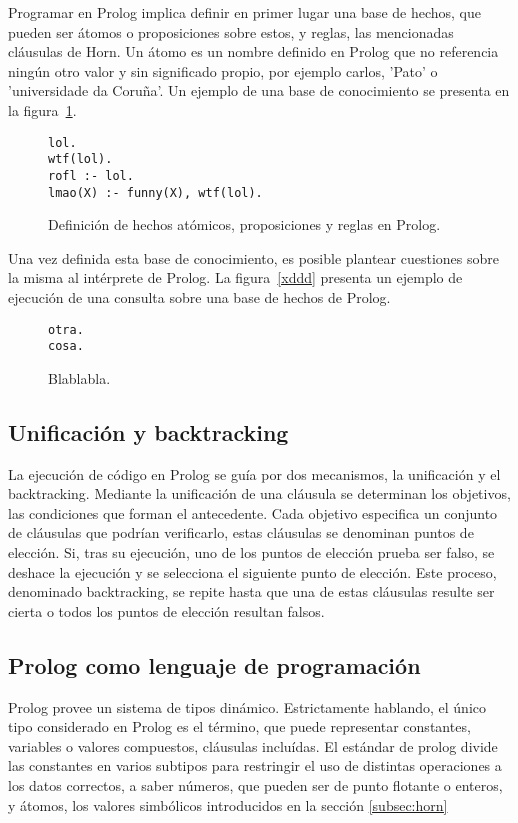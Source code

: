 \documentclass[11pt,captions=nooneline,DIV=14, parskip=full]{scrartcl}
\begin{document}
Programar en Prolog implica definir en primer lugar una base de hechos, que pueden ser átomos o proposiciones sobre estos, y reglas, las mencionadas cláusulas de Horn. Un átomo es un nombre definido en Prolog que no referencia ningún otro valor y sin significado propio, por ejemplo carlos, 'Pato' o 'universidade da Coruña'. Un ejemplo de una base de conocimiento se presenta en la figura~\ref{fig:knowledge}.

\begin{figure}[h]
\label{fig:knowledge}
\lstset{language=Prolog}
\begin{lstlisting}[frame=single]
lol.
wtf(lol).
rofl :- lol.
lmao(X) :- funny(X), wtf(lol).
\end{lstlisting} 
\caption{Definición de hechos atómicos, proposiciones y reglas en Prolog.}
\end{figure}

Una vez definida esta base de conocimiento, es posible plantear cuestiones sobre la misma al intérprete de Prolog. La figura~\ref{xddd} presenta un ejemplo de ejecución de una consulta sobre una base de hechos de Prolog.

\begin{figure}[h]
\label{fig:xddd}
\lstset{language=Prolog}
\begin{lstlisting}[frame=single]
otra.
cosa.
\end{lstlisting} 
\caption{Blablabla.}
\end{figure}


\subsection{Unificación y backtracking}

La ejecución de código en Prolog se guía por dos mecanismos, la unificación y el backtracking. Mediante la unificación de una cláusula se determinan los objetivos, las condiciones que forman el antecedente. Cada objetivo especifica un conjunto de cláusulas que podrían verificarlo, estas cláusulas se denominan puntos de elección. Si, tras su ejecución, uno de los puntos de elección prueba ser falso, se deshace la ejecución y se selecciona el siguiente punto de elección. Este proceso, denominado backtracking, se repite hasta que una de estas cláusulas resulte ser cierta o todos los puntos de elección resultan falsos.

\subsection{Prolog como lenguaje de programación}
Prolog provee un sistema de tipos dinámico. Estrictamente hablando, el único tipo considerado en Prolog es el término, que puede representar constantes, variables o valores compuestos, cláusulas incluídas. El estándar de prolog divide las constantes en varios subtipos para restringir el uso de distintas operaciones a los datos correctos, a saber números, que pueden ser de punto flotante o enteros, y átomos, los valores simbólicos introducidos en la sección \ref{subsec:horn}
\end{document}
